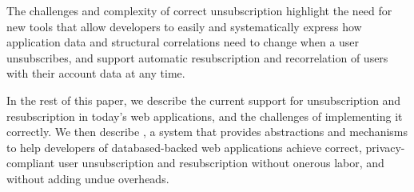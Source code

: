 The challenges and complexity of
correct unsubscription highlight the need for new tools that allow developers to easily and
systematically express how application data and structural correlations need to change when a user
unsubscribes, and support automatic resubscription and recorrelation of users with their account
data at any time.

In the rest of this paper, we describe the current support for unsubscription and resubscription in
today's web applications, and the challenges of implementing it correctly.  We then describe \sys, a
system that provides abstractions and mechanisms to help developers of databased-backed web
applications achieve correct, privacy-compliant user unsubscription and resubscription without
onerous labor, and without adding undue overheads.
